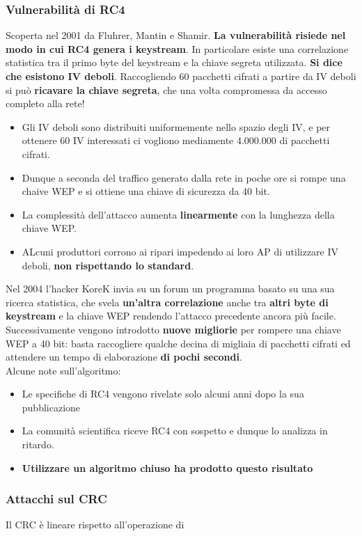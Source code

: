 \documentclass[12pt]{article}
\begin{document}
			\subsubsection{Vulnerabilità di RC4}
				Scoperta nel 2001 da Fluhrer, Mantin e Shamir. \textbf{La vulnerabilità risiede nel modo in cui RC4 genera i keystream}.
				In particolare esiste una correlazione statistica tra il primo byte del keystream e la chiave segreta utilizzata. \textbf{Si dice che esistono IV deboli}. Raccogliendo 60 pacchetti cifrati a partire da IV deboli 	si può \textbf{ricavare la chiave segreta}, che una volta compromessa da accesso completo alla rete!
				\begin{itemize}
					\item Gli IV deboli sono distribuiti uniformemente nello spazio degli IV, e per ottenere 60 IV interessati ci vogliono mediamente 4.000.000 di pacchetti cifrati.
					\item Dunque a seconda del traffico generato dalla rete in poche ore si rompe una chaive WEP e si ottiene una chiave di sicurezza da 40 bit.
					\item La complessità dell'attacco aumenta \textbf{linearmente} con la lunghezza della chiave WEP.
					\item ALcuni produttori corrono ai ripari impedendo ai  loro AP di utilizzare IV deboli, \textbf{non rispettando lo standard}.
				\end{itemize}
				Nel 2004 l'hacker KoreK invia su un forum un programma basato su una sua ricerca statistica, che svela \textbf{un'altra correlazione} anche tra \textbf{altri byte di keystream} e la chiave WEP rendendo l'attacco precedente ancora più facile.\\
				Successivamente vengono introdotto \textbf{nuove migliorie} per rompere una chiave WEP a 40 bit: basta raccogliere qualche decina di migliaia di pacchetti cifrati ed attendere un tempo di elaborazione \textbf{di pochi secondi}.\\
				Alcune note sull'algoritmo:
				\begin{itemize}
					\item Le specifiche di RC4 vengono rivelate solo alcuni anni dopo la sua pubblicazione
					\item La comunità scientifica riceve RC4 con sospetto e dunque lo analizza in ritardo.
					\item \textbf{Utilizzare un algoritmo chiuso ha prodotto questo risultato}
				\end{itemize} 
			\subsubsection{Attacchi sul CRC}
				Il CRC è lineare rispetto all'operazione di 
				
\end{document}
